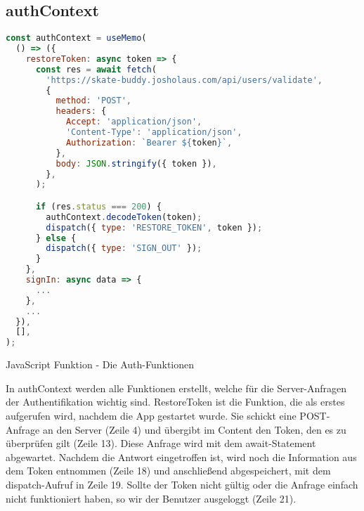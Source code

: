 \subsection{authContext}
\begin{code}[htp]
\begin{lstlisting}[firstnumber=1,language=JavaScript, style=JSX]
const authContext = useMemo(
  () => ({
    restoreToken: async token => {
      const res = await fetch(
        'https://skate-buddy.josholaus.com/api/users/validate',
        {
          method: 'POST',
          headers: {
            Accept: 'application/json',
            'Content-Type': 'application/json',
            Authorization: `Bearer ${token}`,
          },
          body: JSON.stringify({ token }),
        },
      );

      if (res.status === 200) {
        authContext.decodeToken(token);
        dispatch({ type: 'RESTORE_TOKEN', token });
      } else {
        dispatch({ type: 'SIGN_OUT' });
      }
    },
    signIn: async data => {
      ...
    },
    ...
  }),
  [],
);
\end{lstlisting}
\caption{JavaScript Funktion - Die Auth-Funktionen}
\end{code}

In authContext werden alle Funktionen erstellt, welche für die Server-Anfragen der Authentifikation
wichtig sind. RestoreToken ist die Funktion, die als erstes aufgerufen wird, nachdem die App
gestartet wurde. Sie schickt eine POST-Anfrage an den Server (Zeile 4) und übergibt im Content den
Token, den es zu überprüfen gilt (Zeile 13). Diese Anfrage wird mit dem await-Statement abgewartet.
Nachdem die Antwort eingetroffen ist, wird noch die Information aus dem Token entnommen (Zeile 18)
und anschließend abgespeichert, mit dem dispatch-Aufruf in Zeile 19. Sollte der Token nicht gültig
oder die Anfrage einfach nicht funktioniert haben, so wir der Benutzer ausgeloggt (Zeile 21).
